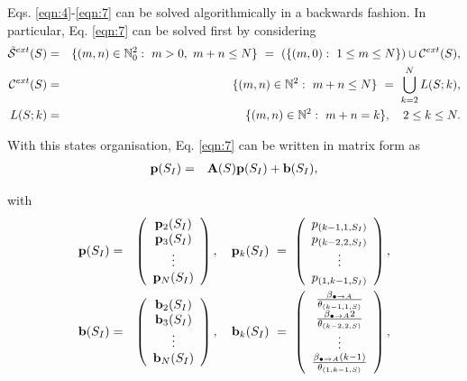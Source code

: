 \documentclass[preprint,12pt]{elsarticle}
\begin{document}
\par Eqs. \eqref{eqn:4}-\eqref{eqn:7} can be solved algorithmically in a backwards fashion. In particular, Eq. \eqref{eqn:7} can be solved first by
considering
\begin{eqnarray*}
 {\cal \tilde S}^{ext}(S) &=& \{(m,n)\in\mathbb{N}_0^2:\ m>0,\ m+n\leq N\} \ = \ \left(\{(m,0):\ 1\leq m\leq N\}\right)\cup{\cal C}^{ext}(S),\\
 {\cal C}^{ext}(S) &=& \{(m,n)\in\mathbb{N}^2:\ m+n\leq N\} \ = \ \bigcup\limits_{k=2}^{N} L(S;k),\\
 L(S;k) &=& \{(m,n)\in\mathbb{N}^2:\ m+n=k\},\quad 2\leq k\leq N.
\end{eqnarray*}

\par\noindent With this states organisation, Eq. \eqref{eqn:7} can be written in matrix form as
\begin{eqnarray}\label{eqn:8}
 {\bf p}(S_I) &=& {\bf A}(S){\bf p}(S_I)+{\bf b}(S_I),
\end{eqnarray}
\par\noindent with
\begin{eqnarray*}
 {\bf p}(S_I) &=& \left(\begin{array}{c}
                         {\bf p}_2(S_I)\\
{\bf p}_3(S_I)\\
\vdots\\
{\bf p}_N(S_I)
\end{array}\right),\quad {\bf p}_k(S_I) \ = \ \left(\begin{array}{c}
p_{(k-1,1,S_I)}\\
p_{(k-2,2,S_I)}\\
\vdots\\
p_{(1,k-1,S_I)}
\end{array}\right),\\
{\bf b}(S_I) &=& \left(\begin{array}{c}
                          {\bf b}_2(S_I)\\
{\bf b}_3(S_I)\\
\vdots\\
{\bf b}_N(S_I)
                         \end{array}\right),\quad
{\bf b}_k(S_I) \ = \ \left(\begin{array}{c}
               \frac{\beta_{\bullet\rightarrow A}}{\theta_{(k-1,1,S)}}\\
\frac{\beta_{\bullet\rightarrow A}2}{\theta_{(k-2,2,S)}}\\
\vdots\\
\frac{\beta_{\bullet\rightarrow A}(k-1)}{\theta_{(1,k-1,S)}}\\
                         \end{array}\right),
\end{eqnarray*}
\end{document}
